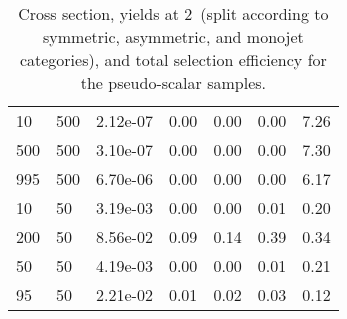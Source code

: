 \begin{table}
\begin{tabular}{lllllll}
10        &   500       &   2.12e-07  &   0.00      &   0.00      &   0.00      &   7.26      \\ 
500       &   500       &   3.10e-07  &   0.00      &   0.00      &   0.00      &   7.30      \\ 
995       &   500       &   6.70e-06  &   0.00      &   0.00      &   0.00      &   6.17      \\ 
10        &   50        &   3.19e-03  &   0.00      &   0.00      &   0.01      &   0.20      \\ 
200       &   50        &   8.56e-02  &   0.09      &   0.14      &   0.39      &   0.34      \\ 
50        &   50        &   4.19e-03  &   0.00      &   0.00      &   0.01      &   0.21      \\ 
95        &   50        &   2.21e-02  &   0.01      &   0.02      &   0.03      &   0.12      \\ 
\hline
\end{tabular}
\caption{Cross section, yields at 2~\ifb (split according to symmetric, asymmetric, and monojet categories), and total selection efficiency for the pseudo-scalar \DMbb samples.}
\label{summaryTableAN_DMbbP_xs10_2p1fb_exp}
\end{table}
